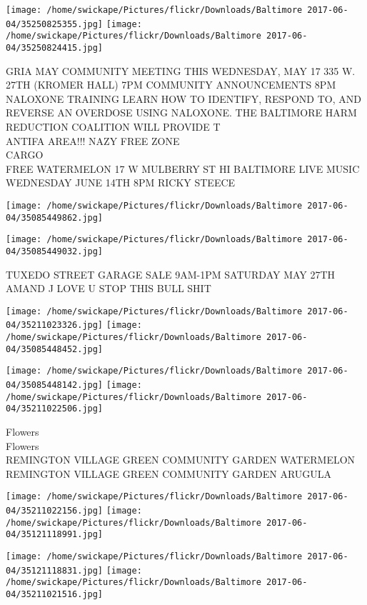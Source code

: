 \documentclass[10pt,letterpaper]{article}
\begin{document}
\texttt{[image: /home/swickape/Pictures/flickr/Downloads/Baltimore 2017-06-04/35250825355.jpg]}
\texttt{[image: /home/swickape/Pictures/flickr/Downloads/Baltimore 2017-06-04/35250824415.jpg]}

GRIA MAY COMMUNITY MEETING THIS WEDNESDAY, MAY 17 335 W. 27TH (KROMER HALL) 7PM COMMUNITY ANNOUNCEMENTS 8PM NALOXONE TRAINING LEARN HOW TO IDENTIFY, RESPOND TO, AND REVERSE AN OVERDOSE USING NALOXONE.  THE BALTIMORE HARM REDUCTION COALITION WILL PROVIDE T\\
ANTIFA AREA!!! NAZY FREE ZONE\\
CARGO\\
FREE WATERMELON 17 W MULBERRY ST HI BALTIMORE LIVE MUSIC WEDNESDAY JUNE 14TH 8PM RICKY STEECE
\pagebreak

\texttt{[image: /home/swickape/Pictures/flickr/Downloads/Baltimore 2017-06-04/35085449862.jpg]}

\vspace{0.25in}
\texttt{[image: /home/swickape/Pictures/flickr/Downloads/Baltimore 2017-06-04/35085449032.jpg]}

TUXEDO STREET GARAGE SALE 9AM{-}1PM SATURDAY MAY 27TH\\
AMAND J LOVE U STOP THIS BULL SHIT
\pagebreak

\texttt{[image: /home/swickape/Pictures/flickr/Downloads/Baltimore 2017-06-04/35211023326.jpg]}
\texttt{[image: /home/swickape/Pictures/flickr/Downloads/Baltimore 2017-06-04/35085448452.jpg]}

\texttt{[image: /home/swickape/Pictures/flickr/Downloads/Baltimore 2017-06-04/35085448142.jpg]}
\texttt{[image: /home/swickape/Pictures/flickr/Downloads/Baltimore 2017-06-04/35211022506.jpg]}

Flowers\\
Flowers\\
REMINGTON VILLAGE GREEN COMMUNITY GARDEN WATERMELON\\
REMINGTON VILLAGE GREEN COMMUNITY GARDEN ARUGULA
\pagebreak

\texttt{[image: /home/swickape/Pictures/flickr/Downloads/Baltimore 2017-06-04/35211022156.jpg]}
\texttt{[image: /home/swickape/Pictures/flickr/Downloads/Baltimore 2017-06-04/35121118991.jpg]}

\texttt{[image: /home/swickape/Pictures/flickr/Downloads/Baltimore 2017-06-04/35121118831.jpg]}
\texttt{[image: /home/swickape/Pictures/flickr/Downloads/Baltimore 2017-06-04/35211021516.jpg]}
\end{document}
